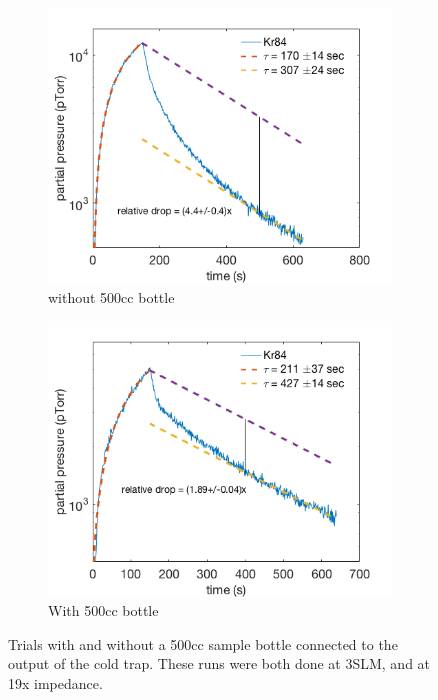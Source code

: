 \begin{figure}[h!]
\centering
\begin{subfigure}{0.5\textwidth}
  \centering
  \includegraphics[width=\textwidth]{Figures/post_flow_transient_nobottle.png}
  \caption{without 500cc bottle}
\end{subfigure}%
\begin{subfigure}{0.5\textwidth}
  \centering
  \includegraphics[width=\textwidth]{Figures/post_flow_transient_wbottle.png}
  \caption{With 500cc bottle}
\end{subfigure}
\caption{Trials with and without a 500cc sample bottle connected to the output of the cold trap. These runs were both done at 3SLM, and at 19x impedance.} 
\label{fig:transientdrop}
\end{figure}

